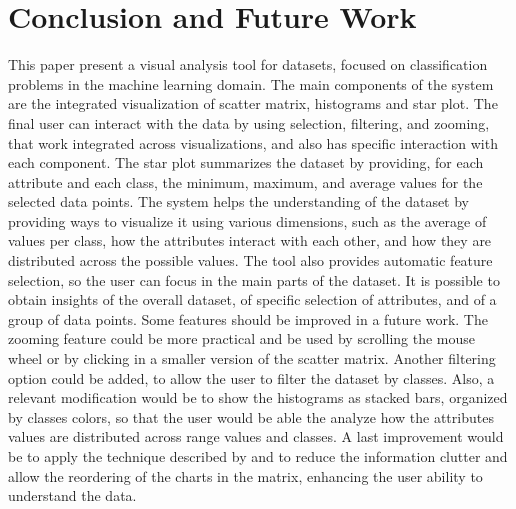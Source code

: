 \documentclass[journal]{IEEEtran}
\begin{document}



\section{Conclusion and Future Work}
This paper present a visual analysis tool for datasets, focused on classification problems in the machine learning domain. The main components of the system are the integrated visualization of scatter matrix, histograms and star plot. The final user can interact with the data by using selection, filtering, and zooming, that work integrated across visualizations, and also has specific interaction with each component. The star plot summarizes the dataset by providing, for each attribute and each class, the minimum, maximum, and average values for the selected data points. The system helps the understanding of the dataset by providing ways to visualize it using various dimensions, such as the average of values per class, how the attributes interact with each other,  and how they are distributed across the possible values. The tool also provides automatic feature selection, so the user can focus in the main parts of the dataset. It is possible to obtain insights of the overall dataset, of specific selection of attributes, and of a group of data points. Some features should be improved in a future work. The zooming feature could be more practical and be used by scrolling the mouse wheel or by clicking in a smaller version of the scatter matrix. Another filtering option could be added, to allow the user to filter the dataset by classes. Also, a relevant modification would be to show the histograms as stacked bars, organized by classes colors, so that the user would be able the analyze how the attributes values are distributed across range values and classes. A last improvement would be to apply the technique described by \cite{peng2004clutter} and \cite{elmqvist2008rolling} to reduce the information clutter and allow the reordering of the charts in the matrix,  enhancing the user ability to understand the data.




\ifCLASSOPTIONcaptionsoff
  \newpage
\fi
\end{document}
